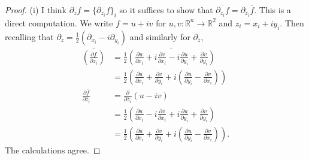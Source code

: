 \documentclass[11pt, letterpaper]{article}
\theoremstyle{plain}
\begin{document}
\begin{proof}
	(i) I think $\partial _zf=\{\partial _{z_i} f\}_i$ so it suffices to show that $\overline{\partial _{z_i}f} =\partial _{\overline{z}_i } \overline{f} $. This is a direct computation. We write $f=u+iv$ for $u,v : \mathbb{R} ^n \to \mathbb{R} ^2$ and $z_i=x_i+iy_i$. Then recalling that $\partial _z=\frac{1}{2} (\partial _{x_i} -i \partial _{y_i} )$ and similarly for $\partial _{\overline{z} } $,
	\begin{align*}
		\overline{\left( \frac{\partial f}{\partial z_i}  \right) } &= \frac{1}{2} \overline{\left(\frac{\partial u}{\partial x_i} +i \frac{\partial v}{\partial x_i} -i \frac{\partial u}{\partial y_i} + \frac{\partial v}{\partial y_i}  \right)}\\
									  &=\frac{1}{2} \left( \frac{\partial u}{\partial x_i} +\frac{\partial v}{\partial y_i} +i\left( \frac{\partial u}{\partial y_i} -\frac{\partial v}{\partial x_i}  \right)  \right) \\
									  \frac{\partial \overline{f} }{\partial \overline{z}_i } &= \frac{\partial }{\partial \overline{z}_i } \left( u-iv \right) \\
																&=\frac{1}{2} \left( \frac{\partial u}{\partial x_i} -i \frac{\partial v}{\partial x_i} +i \frac{\partial u}{\partial y_i} + \frac{\partial v}{\partial y_i}  \right) \\
																&=\frac{1}{2} \left( \frac{\partial u}{\partial x_i} +\frac{\partial v}{\partial y_i} +i\left( \frac{\partial u}{\partial y_i} -\frac{\partial v}{\partial x_i}  \right)  \right) 
	.\end{align*}
	The calculations agree.


\end{proof}
\end{document}
